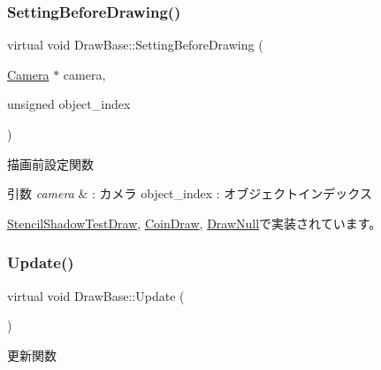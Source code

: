 \mbox{\label{class_draw_base_a3978252914ddde12197ea4577356bf25}} 
\subsubsection{\texorpdfstring{Setting\+Before\+Drawing()}{SettingBeforeDrawing()}}
{\footnotesize\ttfamily virtual void Draw\+Base\+::\+Setting\+Before\+Drawing (\begin{DoxyParamCaption}\item[{\mbox{\hyperlink{class_camera}{Camera}} $\ast$}]{camera,  }\item[{unsigned}]{object\+\_\+index }\end{DoxyParamCaption})\hspace{0.3cm}{\ttfamily [pure virtual]}}



描画前設定関数 


\begin{DoxyParams}{引数}
{\em camera} & \+: カメラ object\+\_\+index \+: オブジェクトインデックス \\
\hline
\end{DoxyParams}


\mbox{\hyperlink{class_stencil_shadow_test_draw_a0f697b6dad67048c7f8916a53cca6b1c}{Stencil\+Shadow\+Test\+Draw}}, \mbox{\hyperlink{class_coin_draw_a66c03acd675ac1820977cb21015abfdb}{Coin\+Draw}}, \mbox{\hyperlink{class_draw_null_a7f0d52c5c2fb2d9b8eb423f363862290}{Draw\+Null}}で実装されています。

\mbox{\label{class_draw_base_af64b19d08a58927a789e2fb8a11cf524}} 
\subsubsection{\texorpdfstring{Update()}{Update()}}
{\footnotesize\ttfamily virtual void Draw\+Base\+::\+Update (\begin{DoxyParamCaption}{ }\end{DoxyParamCaption})\hspace{0.3cm}{\ttfamily [pure virtual]}}



更新関数 



